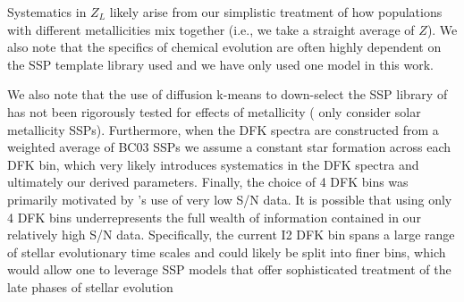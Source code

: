 Systematics in $Z_L$ likely arise from our simplistic treatment of how
populations with different metallicities mix together (i.e., we take a
straight average of $Z$). We also note that the specifics of chemical
evolution are often highly dependent on the SSP template library used
and we have only used one model  in this work.


We also note that the use of diffusion k-means to down-select the SSP
library of \citet{Bruzual03} has not been rigorously tested for
effects of metallicity ( only consider solar
metallicity SSPs). Furthermore, when the DFK spectra are constructed
from a weighted average of BC03 SSPs we assume a constant star
formation across each DFK bin, which very likely introduces
systematics in the DFK spectra and ultimately our derived
parameters. Finally, the choice of 4 DFK bins was primarily motivated
by 's use of very low S/N data. It is possible
that using only 4 DFK bins underrepresents the full wealth of
information contained in our relatively high S/N data. Specifically,
the current I2 DFK bin spans a large range of stellar evolutionary
time scales and could likely be split into finer bins, which would
allow one to leverage SSP models that offer sophisticated treatment of
the late phases of stellar evolution 



